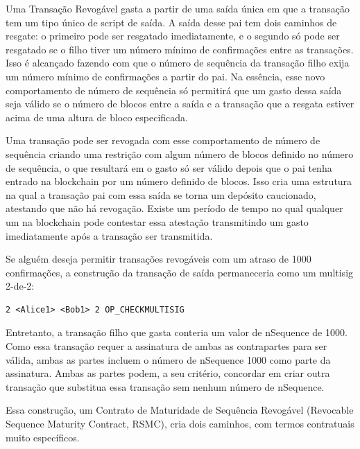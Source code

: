 \documentclass[letterpaper,11pt]{article}
\begin{document}
Uma Transação Revogável gasta a partir de uma saída única em que a transação
tem um tipo único de script de saída. A saída desse pai tem dois caminhos de
resgate: o primeiro pode ser resgatado imediatamente, e o segundo só pode ser
resgatado se o filho tiver um número mínimo de confirmações entre as
transações. Isso é alcançado fazendo com que o número de sequência da
transação filho exija um número mínimo de confirmações a partir do pai. Na
essência, esse novo comportamento de número de sequência só permitirá que um
gasto dessa saída seja válido se o número de blocos entre a saída e a
transação que a resgata estiver acima de uma altura de bloco especificada.

Uma transação pode ser revogada com esse comportamento de número de sequência
criando uma restrição com algum número de blocos definido no número de
sequência, o que resultará em o gasto só ser válido depois que o pai tenha
entrado na blockchain por um número definido de blocos. Isso cria uma
estrutura na qual a transação pai com essa saída se torna um depósito
caucionado, atestando que não há revogação. Existe um período de tempo no
qual qualquer um na blockchain pode contestar essa atestação transmitindo um
gasto imediatamente após a transação ser transmitida.

Se alguém deseja permitir transações revogáveis com um atraso de 1000
confirmações, a construção da transação de saída permaneceria como um
multisig 2-de-2:

\begin{lstlisting}
2 <Alice1> <Bob1> 2 OP_CHECKMULTISIG
\end{lstlisting}

Entretanto, a transação filho que gasta conteria um valor de nSequence de
1000. Como essa transação requer a assinatura de ambas as contrapartes para
ser válida, ambas as partes incluem o número de nSequence 1000 como parte
da assinatura. Ambas as partes podem, a seu critério, concordar em criar
outra transação que substitua essa transação sem nenhum número de
nSequence.

Essa construção, um Contrato de Maturidade de Sequência Revogável (Revocable
Sequence Maturity Contract, RSMC), cria dois caminhos, com termos contratuais
muito específicos.
\end{document}
